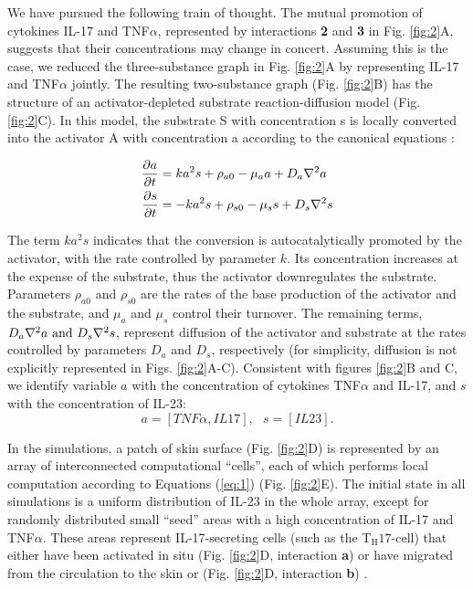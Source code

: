 We have pursued the following train of thought. The mutual promotion of cytokines IL-17 and TNF$\alpha$, represented by interactions \textbf{2} and \textbf{3} in Fig. \ref{fig:2}A, suggests that their concentrations may change in concert. Assuming this is the case, we reduced the three-substance graph in Fig. \ref{fig:2}A by representing IL-17 and TNF$\alpha$ jointly. The resulting two-substance graph (Fig. \ref{fig:2}B) has the structure of an activator-depleted substrate reaction-diffusion model \citep{gierer1972, marcon2016}(Fig. \ref{fig:2}C). In this model, the substrate S with concentration s is locally converted into the activator A with concentration a according to the canonical equations \citep{gierer1972, meinhardt1982}:

\begin{equation}
	\begin{aligned} \label{eq:1}
	\frac{\partial a}{\partial t} &= ka^2s+\rho_{a0}-\mu_a a + D_a \nabla^2 a \\
	\frac{\partial s}{\partial t} &= -ka^2s+\rho_{s0}-\mu_s s + D_s \nabla^2 s
	\end{aligned}
\end{equation}

The term $ka^2s$ indicates that the conversion is autocatalytically promoted by the activator, with the rate controlled by parameter $k$. Its concentration increases at the expense of the substrate, thus the activator downregulates the substrate. Parameters $\rho_{a0}$ and $\rho_{s0}$ are the rates of the base production of the activator and the substrate, and $\mu_a$ and $\mu_s$ control their turnover. The remaining terms, $D_a \nabla^2 a \text{ and } D_s \nabla^2 s$, represent diffusion of the activator and substrate at the rates controlled by parameters $D_a$ and $D_s$, respectively (for simplicity, diffusion is not explicitly represented in Figs. \ref{fig:2}A-C). Consistent with figures \ref{fig:2}B and C, we identify variable $a$ with the concentration of cytokines TNF$\alpha$ and IL-17, and $s$ with the concentration of IL-23:
\[a=[TNF\alpha, IL17],\text{ }s=[IL23].\]

In the simulations, a patch of skin surface (Fig. \ref{fig:2}D) is represented by an array of interconnected computational “cells”, each of which performs local computation according to Equations (\ref{eq:1}) (Fig. \ref{fig:2}E). The initial state in all simulations is a uniform distribution of IL-23 in the whole array, except for randomly distributed small “seed” areas with a high concentration of IL-17 and TNF$\alpha$. These areas represent IL-17-secreting cells (such as the T$_{\text{H}}17$-cell) that either have been activated in situ (Fig. \ref{fig:2}D, interaction \textbf{a}) or have migrated from the circulation to the skin or (Fig. \ref{fig:2}D, interaction \textbf{b}) \citep{krueger2012}. 

